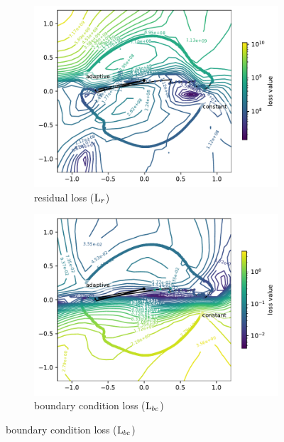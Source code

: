 \documentclass[letterpaper]{article} %
\begin{document}
        \begin{figure}[htb]
            \centering
            
            \begin{subfigure}[b]{0.3\textwidth}
                \centering
                \includegraphics[width=\textwidth]{figures/round3/NTK/map_r_train_loss_loss.pdf}
                \caption{residual loss ($\text{L}_{r}$)}
            \end{subfigure}
            \hfill
            \begin{subfigure}[b]{0.3\textwidth}
                \centering
                \includegraphics[width=\textwidth]{figures/round3/NTK/map_bc_train_loss_loss.pdf}
                \caption{boundary condition loss ($\text{L}_{bc}$)}

\end{subfigure}
\end{figure}
\end{document}

